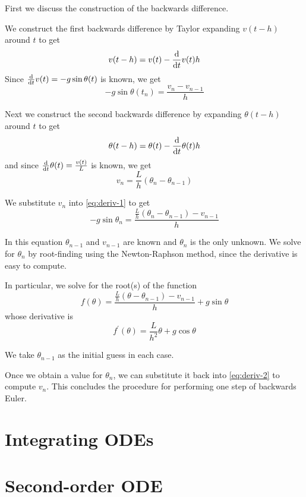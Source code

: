 \documentclass[11pt,letterpaper]{article}
\begin{document}
First we discuss the construction of the backwards difference.

We construct the first backwards difference by Taylor expanding $v(t - h)$
around $t$ to get
%
\begin{equation*}
  v(t - h) = v(t) - \frac{\mathrm{d} }{\mathrm{d} t} v(t) h
\end{equation*}
%
Since $\frac{\mathrm{d} }{\mathrm{d} t} v(t) = -g \sin \theta(t)$ is known, we get
%
\begin{equation}
  \label{eq:deriv-1}
  - g \sin \theta(t_n) = \frac{v_n - v_{n-1}}{h}
\end{equation}

Next we construct the second backwards difference by expanding $\theta(t - h)$
around $t$ to get
%
\begin{equation*}
  \theta(t - h) = \theta(t) - \frac{\mathrm{d} }{\mathrm{d} t} \theta(t) h
\end{equation*}
%
and since $\frac{\mathrm{d} }{\mathrm{d} t} \theta(t) = \frac{v(t)}{L}$ is known, we get
%
\begin{equation}
  \label{eq:deriv-2}
  v_n = \frac{L}{h}(\theta_n - \theta_{n-1})
\end{equation}

We substitute $v_n$ into \eqref{eq:deriv-1} to get
%
\begin{equation*}
  -g \sin \theta_n = \frac{\frac{L}{h}(\theta_n - \theta_{n-1}) - v_{n-1}}{h}
\end{equation*}

In this equation $\theta_{n-1}$ and $v_{n-1}$ are known and $\theta_n$ is the
only unknown. We solve for $\theta_n$ by root-finding using the Newton-Raphson
method, since the derivative is easy to compute.

In particular, we solve for the root(s) of the function
%
\begin{equation*}
  f(\theta)
  = \frac{\frac{L}{h}(\theta - \theta_{n-1}) - v_{n-1}}{h}
  + g \sin \theta
\end{equation*}
%
whose derivative is
%
\begin{equation*}
  f^\prime(\theta)
  = \frac{L}{h^2} \theta + g \cos \theta
\end{equation*}

We take $\theta_{n-1}$ as the initial guess in each case.

Once we obtain a value for $\theta_n$, we can substitute it back into
\eqref{eq:deriv-2} to compute $v_n$. This concludes the procedure for
performing one step of backwards Euler.

\section{Integrating ODEs}

\section{Second-order ODE}
\end{document}
